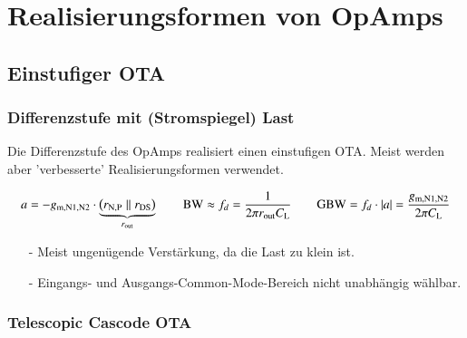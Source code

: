 \section{Realisierungsformen von OpAmps}

\subsection{Einstufiger OTA}

\subsubsection{Differenzstufe mit (Stromspiegel) Last}

Die Differenzstufe des OpAmps realisiert einen einstufigen OTA.
Meist werden aber 'verbesserte' Realisierungsformen verwendet. 

\vspace{-0.3cm}

\[
    a = - g_{\rm m, N1, N2} \cdot \underbrace{ \left( r_{\rm N,P} \parallel r_{\rm DS} \right) }_{r_{\rm out}} \qquad 
    \text{BW} \approx f_d = \frac{1}{2\pi r_{\rm out} C_{\rm L}} \qquad 
    \text{GBW} = f_d \cdot \left|a\right| = \frac{g_{\rm m, N1, N2}}{2\pi C_{\rm L}}
\]

\begin{itemize}
    \item[-] Meist ungenügende Verstärkung, da die Last zu klein ist.
    \item[-] Eingangs- und Ausgangs-Common-Mode-Bereich nicht unabhängig wählbar.
\end{itemize}


\subsubsection{Telescopic Cascode OTA}
\label{Telescopic Cascode OTA}

